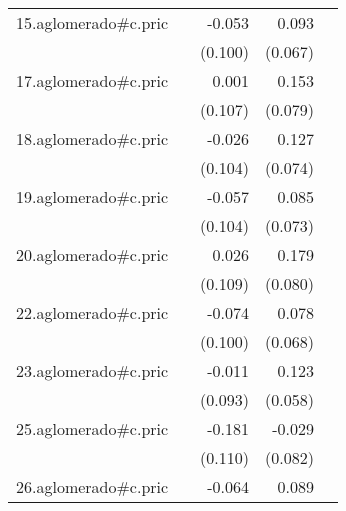{\begin{longtable}{l*{4}{D{.}{.}{-1}}}
\addlinespace
15.aglomerado#c.pric&                     &      -0.053         &       0.093         &                     \\
            &                     &     (0.100)         &     (0.067)         &                     \\
\addlinespace
17.aglomerado#c.pric&                     &       0.001         &       0.153         &                     \\
            &                     &     (0.107)         &     (0.079)         &                     \\
\addlinespace
18.aglomerado#c.pric&                     &      -0.026         &       0.127         &                     \\
            &                     &     (0.104)         &     (0.074)         &                     \\
\addlinespace
19.aglomerado#c.pric&                     &      -0.057         &       0.085         &                     \\
            &                     &     (0.104)         &     (0.073)         &                     \\
\addlinespace
20.aglomerado#c.pric&                     &       0.026         &       0.179\sym{*}  &                     \\
            &                     &     (0.109)         &     (0.080)         &                     \\
\addlinespace
22.aglomerado#c.pric&                     &      -0.074         &       0.078         &                     \\
            &                     &     (0.100)         &     (0.068)         &                     \\
\addlinespace
23.aglomerado#c.pric&                     &      -0.011         &       0.123\sym{*}  &                     \\
            &                     &     (0.093)         &     (0.058)         &                     \\
\addlinespace
25.aglomerado#c.pric&                     &      -0.181         &      -0.029         &                     \\
            &                     &     (0.110)         &     (0.082)         &                     \\
\addlinespace
26.aglomerado#c.pric&                     &      -0.064         &       0.089         &                     \\

\end{longtable}}

